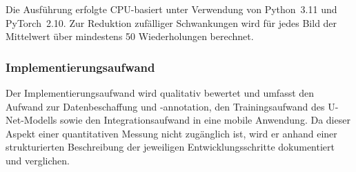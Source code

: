Die Ausführung erfolgte CPU-basiert unter Verwendung von Python~3.11 und PyTorch~2.10. Zur Reduktion zufälliger Schwankungen wird für jedes Bild der Mittelwert über mindestens 50 Wiederholungen berechnet.

\subsubsection{Implementierungsaufwand}

Der Implementierungsaufwand wird qualitativ bewertet und umfasst den Aufwand zur Datenbeschaffung und -annotation, den Trainingsaufwand des U-Net-Modells sowie den Integrationsaufwand in eine mobile Anwendung. Da dieser Aspekt einer quantitativen Messung nicht zugänglich ist, wird er anhand einer strukturierten Beschreibung der jeweiligen Entwicklungsschritte dokumentiert und verglichen.
